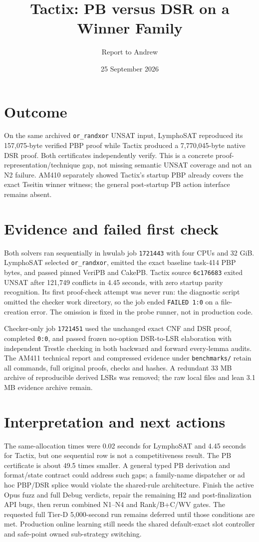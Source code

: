 \documentclass[11pt]{article}
\title{Tactix: PB versus DSR on a Winner Family}
\author{Report to Andrew}
\date{25 September 2026}
\begin{document}
\maketitle
\vspace{-1.5em}

\section*{Outcome}
On the same archived \texttt{or\_randxor} UNSAT input, LymphoSAT reproduced its
157,075-byte verified PBP proof while Tactix produced a 7,770,045-byte native
DSR proof. Both certificates independently verify. This is a concrete
proof-representation/technique gap, not missing semantic UNSAT coverage and
not an N2 failure. AM410 separately showed Tactix's startup PBP already
covers the exact Tseitin winner witness; the general post-startup PB action
interface remains absent.

\section*{Evidence and failed first check}
Both solvers ran sequentially in hwulab job \texttt{1721443} with four CPUs
and 32 GiB. LymphoSAT selected \texttt{or\_randxor}, emitted the exact
baseline task-414 PBP bytes, and passed pinned VeriPB and CakePB. Tactix
source \texttt{6c176683} exited UNSAT after 121,749 conflicts in 4.45 seconds,
with zero startup parity recognition. Its first proof-check attempt was never
run: the diagnostic script omitted the checker work directory, so the job
ended \texttt{FAILED 1:0} on a file-creation error. The omission is fixed in
the probe runner, not in production code.

Checker-only job \texttt{1721451} used the unchanged exact CNF and DSR proof,
completed \texttt{0:0}, and passed frozen no-option DSR-to-LSR elaboration
with independent Trestle checking in both backward and forward every-lemma
audits. The AM411 technical report and compressed evidence under
\texttt{benchmarks/} retain all commands, full original proofs, checks and
hashes. A redundant 33 MB archive of reproducible derived LSRs was removed;
the raw local files and lean 3.1 MB evidence archive remain.

\section*{Interpretation and next actions}
The same-allocation times were 0.02 seconds for LymphoSAT and 4.45 seconds
for Tactix, but one sequential row is not a competitiveness result. The PB
certificate is about 49.5 times smaller. A general typed PB derivation and
format/state contract could address such gaps; a family-name dispatcher or
ad hoc PBP/DSR splice would violate the shared-rule architecture. Finish the
active Opus fuzz and full Debug verdicts, repair the remaining H2 and
post-finalization API bugs, then rerun combined N1--N4 and Rank/B+C/WV gates.
The requested full Tier-D 5,000-second run remains deferred until those
conditions are met. Production online learning still needs the shared
default-exact slot controller and safe-point owned sub-strategy switching.
\end{document}
